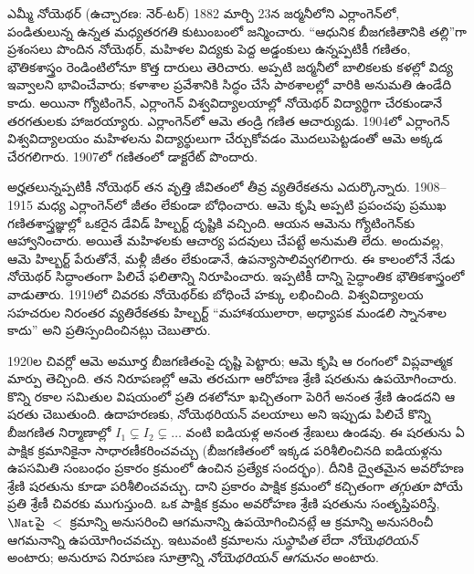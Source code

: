 \documentclass[../../../include/open-logic-section]{subfiles}
\begin{document}



ఎమ్మీ నోయెథర్ (ఉచ్చారణ: నెర్-టర్) 1882 మార్చి 23న జర్మనీలోని ఎర్లాంగెన్‌లో, పండితులున్న ఉన్నత మధ్యతరగతి కుటుంబంలో జన్మించారు. ``ఆధునిక బీజగణితానికి తల్లి''గా ప్రశంసలు పొందిన నోయెథర్, మహిళల విద్యకు పెద్ద అడ్డంకులు ఉన్నప్పటికీ గణితం, భౌతికశాస్త్రం రెండింటిలోనూ కొత్త దారులు తెరిచారు. అప్పటి జర్మనీలో బాలికలకు కళల్లో విద్య ఇవ్వాలని భావించేవారు; కళాశాల ప్రవేశానికి సిద్ధం చేసే పాఠశాలల్లో వారికి అనుమతి ఉండేది కాదు. అయినా గ్యోటింగెన్, ఎర్లాంగెన్ విశ్వవిద్యాలయాల్లో నోయెథర్ విద్యార్థిగా చేరకుండానే తరగతులకు హాజరయ్యారు. ఎర్లాంగెన్‌లో ఆమె తండ్రి గణిత ఆచార్యుడు. 1904లో ఎర్లాంగెన్ విశ్వవిద్యాలయం మహిళలను విద్యార్థులుగా చేర్చుకోవడం మొదలుపెట్టడంతో ఆమె అక్కడ చేరగలిగారు. 1907లో గణితంలో డాక్టరేట్ పొందారు.

అర్హతలున్నప్పటికీ నోయెథర్ తన వృత్తి జీవితంలో తీవ్ర వ్యతిరేకతను ఎదుర్కొన్నారు. 1908--1915 మధ్య ఎర్లాంగెన్‌లో జీతం లేకుండా బోధించారు. ఆమె కృషి అప్పటి ప్రపంచపు ప్రముఖ గణితశాస్త్రజ్ఞుల్లో ఒకరైన డేవిడ్ హిల్బర్ట్ దృష్టికి వచ్చింది. ఆయన ఆమెను గ్యోటింగెన్‌కు ఆహ్వానించారు. అయితే మహిళలకు ఆచార్య పదవులు చేపట్టే అనుమతి లేదు. అందువల్ల, ఆమె హిల్బర్ట్ పేరుతోనే, మళ్లీ జీతం లేకుండానే, ఉపన్యాసాలివ్వగలిగారు. ఈ కాలంలోనే నేడు నోయెథర్ సిద్ధాంతంగా పిలిచే ఫలితాన్ని నిరూపించారు. ఇప్పటికీ దాన్ని సైద్ధాంతిక భౌతికశాస్త్రంలో వాడుతారు. 1919లో చివరకు నోయెథర్‌కు బోధించే హక్కు లభించింది. విశ్వవిద్యాలయ సహచరుల నిరంతర వ్యతిరేకతకు హిల్బర్ట్ ``మహాశయులారా, అధ్యాపక మండలి స్నానశాల కాదు'' అని ప్రతిస్పందించినట్లు చెబుతారు.

1920ల చివర్లో ఆమె అమూర్త బీజగణితంపై దృష్టి పెట్టారు; ఆమె కృషి ఆ రంగంలో విప్లవాత్మక మార్పు తెచ్చింది. తన నిరూపణల్లో ఆమె తరచుగా ఆరోహణ శ్రేణి షరతును ఉపయోగించారు. కొన్ని రకాల సమితుల విషయంలో ప్రతి దశలోనూ ఖచ్చితంగా పెరిగే అనంత శ్రేణి ఉండదని ఆ షరతు చెబుతుంది. ఉదాహరణకు, నోయెథరియన్ వలయాలు అని ఇప్పుడు పిలిచే కొన్ని బీజగణిత నిర్మాణాల్లో $I_1
\subsetneq I_2 \subsetneq \dots$ వంటి ఐడియళ్ల అనంత శ్రేణులు ఉండవు. ఈ షరతును ఏ పాక్షిక క్రమానికైనా సాధారణీకరించవచ్చు (బీజగణితంలో ఇక్కడ పరిశీలించినది ఐడియళ్లను ఉపసమితి సంబంధం ప్రకారం క్రమంలో ఉంచిన ప్రత్యేక సందర్భం). దీనికి ద్వైతమైన అవరోహణ శ్రేణి షరతును కూడా పరిశీలించవచ్చు. దాని ప్రకారం పాక్షిక క్రమంలో కచ్చితంగా \emph{తగ్గుతూ} పోయే ప్రతి శ్రేణీ చివరకు ముగుస్తుంది. ఒక పాక్షిక క్రమం అవరోహణ శ్రేణి షరతును సంతృప్తిపరిస్తే,~$\Nat$పై $<$ క్రమాన్ని అనుసరించి ఆగమనాన్ని ఉపయోగించినట్లే ఆ క్రమాన్ని అనుసరించీ ఆగమనాన్ని ఉపయోగించవచ్చు. ఇటువంటి క్రమాలను \emph{సుస్థాపిత} లేదా \emph{నోయెథరియన్} అంటారు; అనురూప నిరూపణ సూత్రాన్ని \emph{నోయెథరియన్ ఆగమనం} అంటారు.
\end{document}
